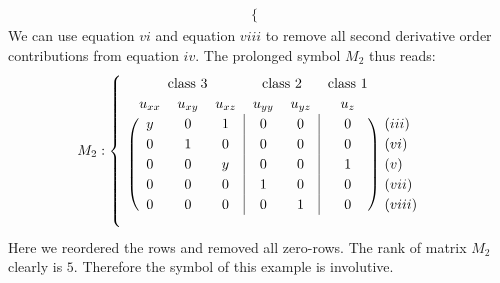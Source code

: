 \begin{example}
\begin{align}
\begin{cases}
            \end{cases}
\end{align}
We can use equation $vi$ and equation $viii$ to remove all second derivative order contributions from equation $iv$.
The prolonged symbol $M_2$ thus reads:
\begin{align}
M_2 : \begin{cases}
\ \ 
\begin{blockarray}{ccccccc}
\BAmulticolumn{3}{c}{\text{class 3}} & 
\BAmulticolumn{2}{c}{\text{class 2}} & 
\text{class 1} \\
u_{xx} & u_{xy} & u_{xz} & u_{yy} & u_{yz} & u_{z} \\
\begin{block}{(ccc|cc|c)l}
  y & 0 & 1 & 0 & 0 & 0 & (iii) \\
  0 & 1 & 0 & 0 & 0 & 0 & (vi) \\
  0 & 0 & y & 0 & 0 & 1 & (v) \\
  0 & 0 & 0 & 1 & 0 & 0 & (vii) \\
  0 & 0 & 0 & 0 & 1 & 0 & (viii) \\
\end{block}
\end{blockarray}
\end{cases}
\end{align}
Here we reordered the rows and removed all zero-rows. The rank of matrix $M_2$ clearly is $5$. Therefore the symbol of this example is involutive.
\end{example}

